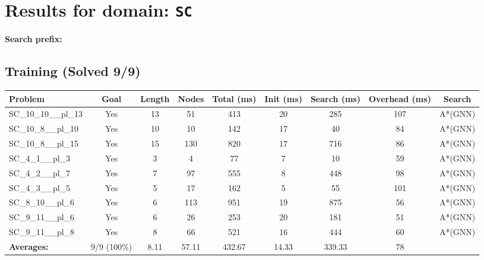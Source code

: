 \documentclass{article}
\begin{document}
\section*{Results for domain: \texttt{SC}}
\textbf{Search prefix:} 
\\[0.5cm]
\subsection*{Training (Solved 9/9)}
\begin{tabular}{lcccccccc}
\toprule
Problem & Goal & Length & Nodes & Total (ms) & Init (ms) & Search (ms) & Overhead (ms) & Search \\
\midrule
SC\_10\_10\_\_pl\_13 & Yes & 13 & 51 & 413 & 20 & 285 & 107 & A*(GNN) \\
SC\_10\_8\_\_pl\_10 & Yes & 10 & 10 & 142 & 17 & 40 & 84 & A*(GNN) \\
SC\_10\_8\_\_pl\_15 & Yes & 15 & 130 & 820 & 17 & 716 & 86 & A*(GNN) \\
SC\_4\_1\_\_pl\_3 & Yes & 3 & 4 & 77 & 7 & 10 & 59 & A*(GNN) \\
SC\_4\_2\_\_pl\_7 & Yes & 7 & 97 & 555 & 8 & 448 & 98 & A*(GNN) \\
SC\_4\_3\_\_pl\_5 & Yes & 5 & 17 & 162 & 5 & 55 & 101 & A*(GNN) \\
SC\_8\_10\_\_pl\_6 & Yes & 6 & 113 & 951 & 19 & 875 & 56 & A*(GNN) \\
SC\_9\_11\_\_pl\_6 & Yes & 6 & 26 & 253 & 20 & 181 & 51 & A*(GNN) \\
SC\_9\_11\_\_pl\_8 & Yes & 8 & 66 & 521 & 16 & 444 & 60 & A*(GNN) \\
\textbf{Averages:} & 9/9 (100\%) & 8.11 & 57.11 & 432.67 & 14.33 & 339.33 & 78 & \\
\bottomrule
\end{tabular}
\\[0.7cm]
\end{document}
